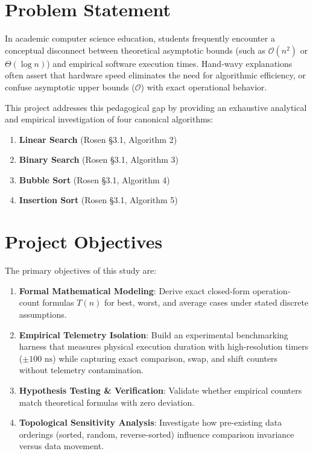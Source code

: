 \section{Problem Statement}
In academic computer science education, students frequently encounter a conceptual disconnect between theoretical asymptotic bounds (such as $\mathcal{O}(n^2)$ or $\Theta(\log n)$) and empirical software execution times. Hand-wavy explanations often assert that hardware speed eliminates the need for algorithmic efficiency, or confuse asymptotic upper bounds ($\mathcal{O}$) with exact operational behavior. 

This project addresses this pedagogical gap by providing an exhaustive analytical and empirical investigation of four canonical algorithms:
\begin{enumerate}
    \item \textbf{Linear Search} (Rosen §3.1, Algorithm 2)
    \item \textbf{Binary Search} (Rosen §3.1, Algorithm 3)
    \item \textbf{Bubble Sort} (Rosen §3.1, Algorithm 4)
    \item \textbf{Insertion Sort} (Rosen §3.1, Algorithm 5)
\end{enumerate}

\section{Project Objectives}
The primary objectives of this study are:
\begin{enumerate}
    \item \textbf{Formal Mathematical Modeling}: Derive exact closed-form operation-count formulas $T(n)$ for best, worst, and average cases under stated discrete assumptions.
    \item \textbf{Empirical Telemetry Isolation}: Build an experimental benchmarking harness that measures physical execution duration with high-resolution timers ($\pm 100\text{ ns}$) while capturing exact comparison, swap, and shift counters without telemetry contamination.
    \item \textbf{Hypothesis Testing \& Verification}: Validate whether empirical counters match theoretical formulas with zero deviation.
    \item \textbf{Topological Sensitivity Analysis}: Investigate how pre-existing data orderings (sorted, random, reverse-sorted) influence comparison invariance versus data movement.
\end{enumerate}

